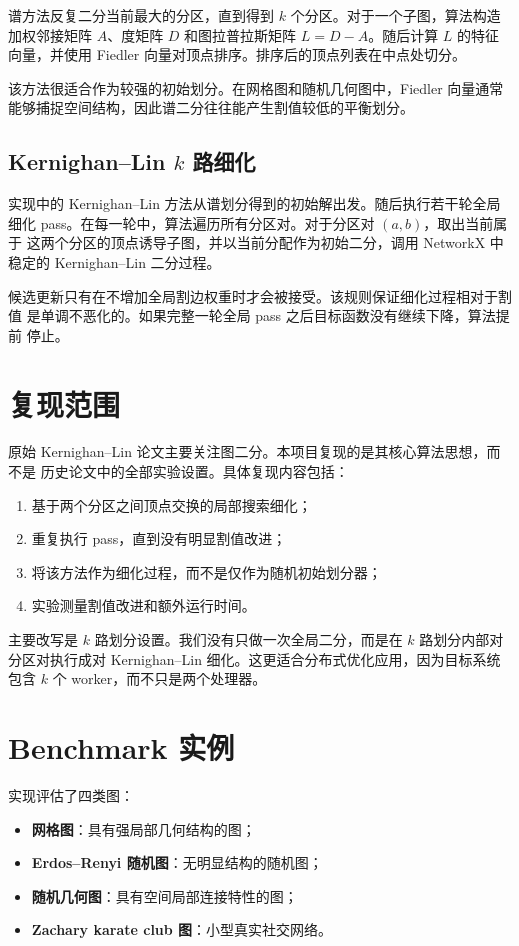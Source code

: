 \documentclass[UTF8, 11pt]{ctexart}
\begin{document}
谱方法反复二分当前最大的分区，直到得到 $k$ 个分区。对于一个子图，算法构造
加权邻接矩阵 $A$、度矩阵 $D$ 和图拉普拉斯矩阵 $L=D-A$。随后计算 $L$ 的特征
向量，并使用 Fiedler 向量对顶点排序。排序后的顶点列表在中点处切分。

该方法很适合作为较强的初始划分。在网格图和随机几何图中，Fiedler 向量通常
能够捕捉空间结构，因此谱二分往往能产生割值较低的平衡划分。

\subsection{Kernighan--Lin $k$ 路细化}

实现中的 Kernighan--Lin 方法从谱划分得到的初始解出发。随后执行若干轮全局
细化 pass。在每一轮中，算法遍历所有分区对。对于分区对 $(a,b)$，取出当前属于
这两个分区的顶点诱导子图，并以当前分配作为初始二分，调用 NetworkX 中稳定的
Kernighan--Lin 二分过程。

候选更新只有在不增加全局割边权重时才会被接受。该规则保证细化过程相对于割值
是单调不恶化的。如果完整一轮全局 pass 之后目标函数没有继续下降，算法提前
停止。

\section{复现范围}

原始 Kernighan--Lin 论文主要关注图二分。本项目复现的是其核心算法思想，而不是
历史论文中的全部实验设置。具体复现内容包括：
\begin{enumerate}
    \item 基于两个分区之间顶点交换的局部搜索细化；
    \item 重复执行 pass，直到没有明显割值改进；
    \item 将该方法作为细化过程，而不是仅作为随机初始划分器；
    \item 实验测量割值改进和额外运行时间。
\end{enumerate}

主要改写是 $k$ 路划分设置。我们没有只做一次全局二分，而是在 $k$ 路划分内部对
分区对执行成对 Kernighan--Lin 细化。这更适合分布式优化应用，因为目标系统包含
$k$ 个 worker，而不只是两个处理器。

\section{Benchmark 实例}

实现评估了四类图：
\begin{itemize}
    \item \textbf{网格图}：具有强局部几何结构的图；
    \item \textbf{Erdos--Renyi 随机图}：无明显结构的随机图；
    \item \textbf{随机几何图}：具有空间局部连接特性的图；
    \item \textbf{Zachary karate club 图}：小型真实社交网络。
\end{itemize}
\end{document}

